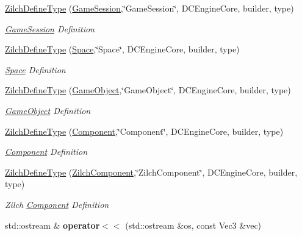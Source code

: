 \begin{DoxyCompactItemize}
\hyperlink{namespaceDCEngine_a3cde4c8626f889d4a5fedc7b776addfb}{Zilch\-Define\-Type} (\hyperlink{classDCEngine_1_1GameSession}{Game\-Session},\char`\"{}Game\-Session\char`\"{}, D\-C\-Engine\-Core, builder, type)
\begin{DoxyCompactList}\small\item\em \hyperlink{classDCEngine_1_1GameSession}{Game\-Session} Definition  \end{DoxyCompactList}\item 
\hyperlink{namespaceDCEngine_a5850299cede5dfdf265b616f4f32bf69}{Zilch\-Define\-Type} (\hyperlink{classDCEngine_1_1Space}{Space},\char`\"{}Space\char`\"{}, D\-C\-Engine\-Core, builder, type)
\begin{DoxyCompactList}\small\item\em \hyperlink{classDCEngine_1_1Space}{Space} Definition  \end{DoxyCompactList}\item 
\hyperlink{namespaceDCEngine_ac72cd208fbb43218809aca31ea95108d}{Zilch\-Define\-Type} (\hyperlink{classDCEngine_1_1GameObject}{Game\-Object},\char`\"{}Game\-Object\char`\"{}, D\-C\-Engine\-Core, builder, type)
\begin{DoxyCompactList}\small\item\em \hyperlink{classDCEngine_1_1GameObject}{Game\-Object} Definition  \end{DoxyCompactList}\item 
\hyperlink{namespaceDCEngine_a7a0613c0a700671c6172fddff3ee9f04}{Zilch\-Define\-Type} (\hyperlink{classDCEngine_1_1Component}{Component},\char`\"{}Component\char`\"{}, D\-C\-Engine\-Core, builder, type)
\begin{DoxyCompactList}\small\item\em \hyperlink{classDCEngine_1_1Component}{Component} Definition  \end{DoxyCompactList}\item 
\hyperlink{namespaceDCEngine_a154116616894dba1b2a9709abf969845}{Zilch\-Define\-Type} (\hyperlink{classDCEngine_1_1ZilchComponent}{Zilch\-Component},\char`\"{}Zilch\-Component\char`\"{}, D\-C\-Engine\-Core, builder, type)
\begin{DoxyCompactList}\small\item\em Zilch \hyperlink{classDCEngine_1_1Component}{Component} Definition  \end{DoxyCompactList}\item 
\hypertarget{namespaceDCEngine_a6e685aa0cc9b8456f769decc25cdc90a}{std\-::ostream \& {\bfseries operator$<$$<$} (std\-::ostream \&os, const Vec3 \&vec)}\label{namespaceDCEngine_a6e685aa0cc9b8456f769decc25cdc90a}


\end{DoxyCompactItemize}
